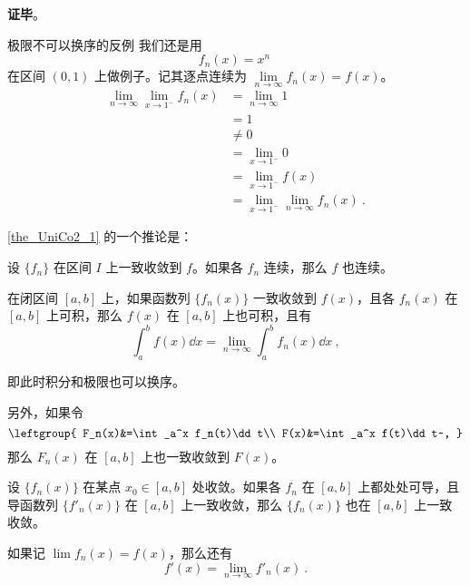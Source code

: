
\textbf{证毕}。



\begin{example}{极限不可以换序的反例}
我们还是用
\begin{equation}
f_n(x)=x^n~
\end{equation}
在区间 $(0, 1)$ 上做例子。记其逐点连续为 $\lim\limits_{n\to\infty}f_n(x)=f(x)$。
\begin{equation}
\begin{aligned}
\lim\limits_{n\to\infty}\lim\limits_{x\to 1^-}f_n(x)&=\lim\limits_{n\to\infty}1\\
&=1\\
&\not=0\\
&=\lim\limits_{x\to 1^-} 0\\
&=\lim\limits_{x\to 1^-}f(x)\\
&=\lim\limits_{x\to 1^-}\lim\limits_{n\to\infty}f_n(x)~.
\end{aligned}
\end{equation}
\end{example}

\autoref{the_UniCo2_1} 的一个推论是：
\begin{corollary}{}
设 $\{f_n\}$ 在区间 $I$ 上一致收敛到 $f$。如果各 $f_n$ 连续，那么 $f$ 也连续。
\end{corollary}

\begin{theorem}{}
在闭区间 $[a, b]$ 上，如果函数列 $\{f_n(x)\}$ 一致收敛到 $f(x)$，且各 $f_n(x)$ 在 $[a, b]$ 上可积，那么 $f(x)$ 在 $[a, b]$ 上也可积，且有
\begin{equation}
\int_a^b f(x) \dd x=\lim_{n\to\infty}\int_a^b f_n(x)\dd x~,
\end{equation}

即此时积分和极限也可以换序。

另外，如果令
\begin{equation}
\leftgroup{
    F_n(x)&=\int_a^x f_n(t)\dd t\\
    F(x)&=\int_a^x f(t)\dd t~,
}
\end{equation}
那么 $F_n(x)$ 在 $[a, b]$ 上也一致收敛到 $F(x)$。

\end{theorem}

\begin{theorem}{}
设 $\{f_n(x)\}$ 在某点 $x_0\in [a, b]$ 处收敛。如果各 $f_n$ 在 $[a, b]$ 上都处处可导，且导函数列 $\{f'_n(x)\}$ 在 $[a, b]$ 上一致收敛，那么 $\{f_n(x)\}$ 也在 $[a, b]$ 上一致收敛。

如果记 $\lim f_n(x)=f(x)$，那么还有
\begin{equation}
f'(x)=\lim\limits_{n\to\infty}f'_n(x)~.
\end{equation}
\end{theorem}

















